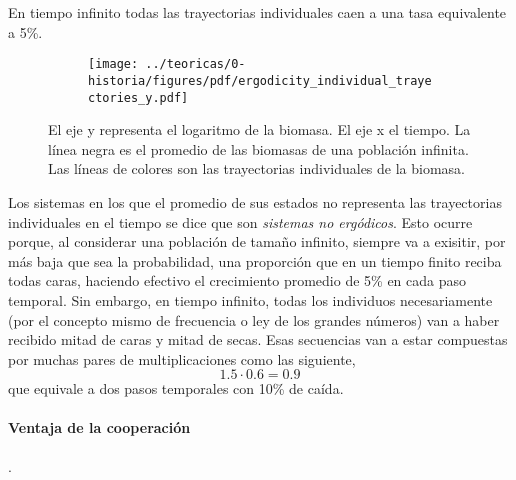 \documentclass[a4paper,10pt]{article}
\begin{document}
%
En tiempo infinito todas las trayectorias individuales caen a una tasa equivalente a 5\%.
%
\begin{figure}[ht!]
    \centering
    \begin{subfigure}[b]{0.4\linewidth}
    \texttt{[image: ../teoricas/0-historia/figures/pdf/ergodicity\_individual\_trayectories\_y.pdf]}
    \end{subfigure}
    \caption{El eje y representa el logaritmo de la biomasa. El eje x el tiempo. La línea negra es el promedio de las biomasas de una población infinita. Las líneas de colores son las trayectorias individuales de la biomasa. }
\end{figure}
%
Los sistemas en los que el promedio de sus estados no representa las trayectorias individuales en el tiempo se dice que son \emph{sistemas no ergódicos}.
Esto ocurre porque, al considerar una población de tamaño infinito, siempre va a exisitir, por más baja que sea la probabilidad, una proporción que en un tiempo finito reciba todas caras, haciendo efectivo el crecimiento promedio de 5\% en cada paso temporal.
Sin embargo, en tiempo infinito, todas los individuos necesariamente (por el concepto mismo de frecuencia o ley de los grandes números) van a haber recibido mitad de caras y mitad de secas.
Esas secuencias van a estar compuestas por muchas pares de multiplicaciones como las siguiente,
%
\begin{equation}
1.5 \cdot 0.6 = 0.9
\end{equation}
%
que equivale a dos pasos temporales con 10\% de caída.

\paragraph{Ventaja de la cooperación} .

\end{document}
